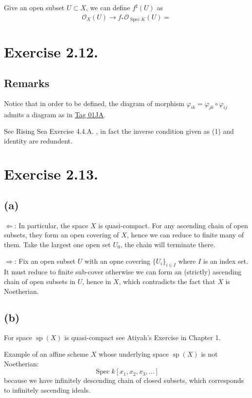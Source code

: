 Give an open subset $U\subset X$, we can define $f^{\sharp}(U)$ as 
\begin{align*}
    \mathscr O_X(U)\to f_{\ast}\mathscr O_{\operatorname{Spec}K} (U)=
\end{align*}

\section{Exercise 2.12.}

\subsection{Remarks}

Notice that in order to be defined, the diagram of morphism $\varphi_{ik}=\varphi_{jk}\circ\varphi_{ij}$ admits a diagram as in \href{https://stacks.math.columbia.edu/tag/01JA}{Tag 01JA}.

See Rising Sea Exercise 4.4.A. , in fact the inverse condition given as (1) and identity are redundent.

\section{Exercise 2.13.}\label{Hart Chap 2 Ex 2.13.}

\subsection{(a)}

$\Leftarrow$: In particular, the space $X$ is quasi-compact. For any ascending chain of open subsets, they form an open covering of $X$, hence we can reduce to finite many of them. Take the largest one open set $U_0$, the chain will terminate there. 

$\Rightarrow$: Fix an open subset $U$ with an opne covering $\{U_i\}_{i\in I}$ where $I$ is an index set. It must reduce to finite sub-cover otherwise we can form an (strictly) ascending chain of open subsets in $U$, hence in $X$, which contradicts the fact that $X$ is Noetherian. 

\subsection{(b)}

For space $\operatorname{sp}(X)$ is quasi-compact see Atiyah's Exercise in Chapter 1. 

Example of an affine scheme $X$ whose underlying space $\operatorname{sp}(X)$ is not Noetherian: 
\[\operatorname{Spec}k[x_1,x_2,x_3,...]\] because we have infinitely descending chain of closed subsets, which corresponds to infinitely ascending ideals. 


